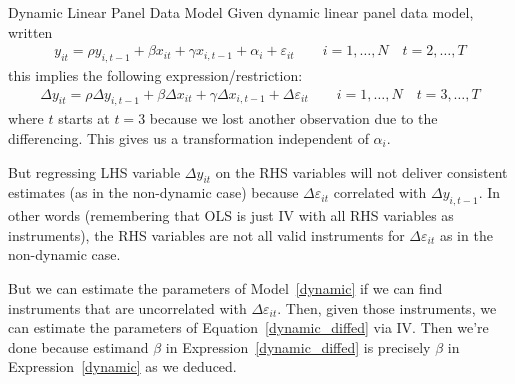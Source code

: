 \documentclass[aspectratio=169, handout]{beamer}
\begin{document}
{\footnotesize
\begin{frame}{Dynamic Linear Panel Data Model}
Given dynamic linear panel data model, written
\begin{align}
  y_{it}
  =
  \rho y_{i,t-1}
  + \beta x_{it}
  + \gamma x_{i,t-1}
  + \alpha_i
  + \varepsilon_{it}
  \qquad
  i = 1,\ldots,N
  \quad
  t = 2,\ldots,T
  \label{dynamic}
\end{align}
this implies the following expression/restriction:
\begin{align}
  \Delta y_{it}
  =
  \rho \Delta y_{i,t-1}
  + \beta \Delta x_{it}
  + \gamma \Delta x_{i,t-1}
  + \Delta \varepsilon_{it}
  \qquad
  i = 1,\ldots,N
  \quad
  t = 3,\ldots,T
  \label{dynamic_diffed}
\end{align}
where $t$ starts at $t=3$ because we lost another observation due to the
differencing.
This gives us a transformation independent of $\alpha_i$.

But regressing LHS variable $\Delta y_{it}$ on the RHS variables will
not deliver consistent estimates (as in the non-dynamic case) because
$\Delta \varepsilon_{it}$ correlated with $\Delta y_{i,t-1}$.
In other words (remembering that OLS is just IV with all RHS variables
as instruments), the RHS variables are not all valid instruments for
$\Delta \varepsilon_{it}$ as in the non-dynamic case.

But we can estimate the parameters of Model~\ref{dynamic} if we can find
instruments that are uncorrelated with $\Delta \varepsilon_{it}$.
Then, given those instruments, we can estimate the parameters
of Equation~\ref{dynamic_diffed} via IV.
Then we're done because estimand $\beta$ in
Expression~\ref{dynamic_diffed} is precisely $\beta$ in
Expression~\ref{dynamic} as we deduced.
\end{frame}
}
\end{document}
